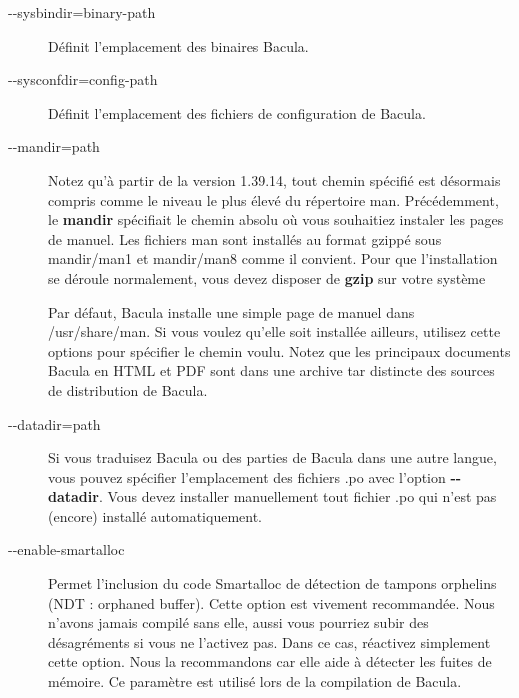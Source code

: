 {{{\begin{description}

\item [{-}{-}sysbindir=\lt{}binary-path\gt{}]
   D\'efinit l'emplacement des binaires Bacula.  

\item [{-}{-}sysconfdir=\lt{}config-path\gt{}]
   D\'efinit l'emplacement des fichiers de  configuration de Bacula.  

\item [ {-}{-}mandir=\lt{}path\gt{}]
   Notez qu'\`a partir de la version 1.39.14, tout chemin sp\'ecifi\'e 
   est d\'esormais compris comme le niveau le plus \'elev\'e du 
   r\'epertoire man. Pr\'ec\'edemment, le {\bf mandir} sp\'ecifiait le 
   chemin absolu o\`u vous souhaitiez instaler les pages de manuel.
   Les fichiers man sont install\'es au format gzipp\'e sous 
   mandir/man1 et mandir/man8 comme il convient.
   Pour que l'installation se d\'eroule normalement, vous devez 
   disposer de {\bf gzip} sur votre syst\`eme

   Par d\'efaut, Bacula installe une simple page de manuel dans 
   /usr/share/man. Si vous voulez qu'elle soit install\'ee ailleurs, 
   utilisez cette options pour sp\'ecifier le chemin voulu. Notez 
   que les principaux documents Bacula en HTML et PDF sont dans une 
   archive tar distincte des sources de distribution de Bacula.

\item [ {-}{-}datadir=\lt{}path\gt{}]
   Si vous traduisez Bacula ou des parties de Bacula dans une autre 
   langue, vous pouvez sp\'ecifier l'emplacement des fichiers .po avec 
   l'option {\bf {-}{-}datadir}. Vous devez installer manuellement tout 
   fichier .po qui n'est pas (encore) install\'e automatiquement.

\item [{-}{-}enable-smartalloc ]
   Permet l'inclusion du code Smartalloc de d\'etection de tampons  orphelins
(NDT : orphaned buffer). Cette option est vivement recommand\'ee. Nous n'avons
jamais  compil\'e sans elle, aussi vous pourriez subir des d\'esagr\'ements si
vous ne l'activez pas.  Dans ce cas, r\'eactivez simplement cette option. Nous
la recommandons car elle aide \`a d\'etecter les fuites de m\'emoire.  Ce
param\`etre est utilis\'e lors de la compilation de Bacula.  


\end{description}}}}
